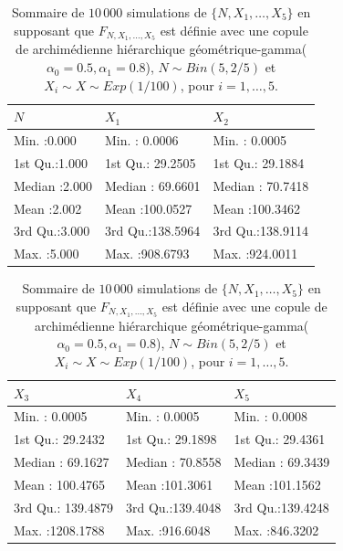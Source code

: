 \documentclass{article}
\begin{document}
	\begin{table}[H]
		\centering
		\begin{tabular}{lll}
			\hline
			$N$ &       $X_1$ &       $X_2$        \\ 
			\hline
			  Min.   :0.000   & Min.   :  0.0006   & Min.   :  0.0005    \\ 
			  1st Qu.:1.000   & 1st Qu.: 29.2505   & 1st Qu.: 29.1884    \\ 
			  Median :2.000   & Median : 69.6601   & Median : 70.7418       \\ 
			  Mean   :2.002   & Mean   :100.0527   & Mean   :100.3462       \\ 
			  3rd Qu.:3.000   & 3rd Qu.:138.5964   & 3rd Qu.:138.9114      \\ 
			  Max.   :5.000   & Max.   :908.6793   & Max.   :924.0011   \\ 
			\hline
		\end{tabular}
		\begin{tabular}{lll}
			\hline
			$X_3$ &       $X_4$ &       $X_5$ \\ 
			\hline
			  Min.   :   0.0005   & Min.   :  0.0005   & Min.   :  0.0008   \\ 
			  1st Qu.:  29.2432   & 1st Qu.: 29.1898   & 1st Qu.: 29.4361   \\ 
			  Median :  69.1627   & Median : 70.8558   & Median : 69.3439   \\ 
			  Mean   : 100.4765   & Mean   :101.3061   & Mean   :101.1562   \\ 
			  3rd Qu.: 139.4879   & 3rd Qu.:139.4048   & 3rd Qu.:139.4248   \\ 
			  Max.   :1208.1788   & Max.   :916.6048   & Max.   :846.3202   \\   
			\hline
		\end{tabular}
		\caption[Sommaire des données simulées pour le scénario \ref{scenario_geo_gamma}]{Sommaire de $10\,000$ simulations de $\{N, X_1, \dots, X_5\}$ en supposant que $F_{N,X_1,\dots, X_5}$ est définie avec une copule de archimédienne hiérarchique géométrique-gamma($\alpha_0=0.5, \alpha_1 = 0.8$), $N \sim Bin(5, 2/5)$ et $X_i \sim X \sim Exp(1/100)$, pour $i=1,\dots, 5$.}
		\label{tbl_sommaire_geo_gamma}
	\end{table}
	
\end{document}
